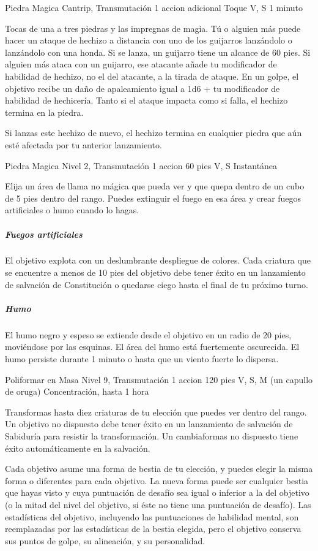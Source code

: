 \documentclass[a4paper,twocolumn,openany,10pt]{dndbook}
\begin{document}
\spellheader%
	{Piedra Magica}
	{Cantrip, Transmutación}
	{1 accion adicional}
	{Toque}
	{V, S}
	{1 minuto}
	
	Tocas de una a tres piedras y las impregnas de magia. Tú o alguien más puede hacer un ataque de hechizo a distancia con uno
	de los guijarros lanzándolo o lanzándolo con una honda. Si se lanza, un guijarro tiene un alcance de 60 pies. Si alguien más
	ataca con un guijarro, ese atacante añade tu modificador de habilidad de hechizo, no el del atacante, a la tirada de ataque.
	En un golpe, el objetivo recibe un daño de apaleamiento igual a 1d6 + tu modificador de habilidad de hechicería. Tanto si el
	ataque impacta como si falla, el hechizo termina en la piedra.
	
	Si lanzas este hechizo de nuevo, el hechizo termina en cualquier piedra que aún esté afectada por tu anterior lanzamiento. 

\spellheader%
	{Piedra Magica}
	{Nivel 2, Transmutación}
	{1 accion}
	{60 pies}
	{V, S}
	{Instantánea}
	
	Elija un área de llama no mágica que pueda ver y que quepa dentro de un cubo de 5 pies dentro del rango. Puedes extinguir el
	fuego en esa área y crear fuegos artificiales o humo cuando lo hagas.
	
	\subparagraph{Fuegos artificiales} El objetivo explota con un deslumbrante despliegue de colores. Cada criatura que se
	encuentre a menos de 10 pies del objetivo debe tener éxito en un lanzamiento de salvación de Constitución o quedarse ciego
	hasta el final de tu próximo turno.
	
	\subparagraph{Humo} El humo negro y espeso se extiende desde el objetivo en un radio de 20 pies, moviéndose por las
	esquinas. El área del humo está fuertemente oscurecida. El humo persiste durante 1 minuto o hasta que un viento fuerte lo
	dispersa. 

\spellheader%
	{Poliformar en Masa}
	{Nivel 9, Transmutación}
	{1 accion}
	{120 pies}
	{V, S, M (un capullo de oruga)}
	{Concentración, hasta 1 hora}
	
	Transformas hasta diez criaturas de tu elección que puedes ver dentro del rango. Un objetivo no dispuesto debe tener éxito
	en un lanzamiento de salvación de Sabiduría para resistir la transformación. Un cambiaformas no dispuesto tiene éxito
	automáticamente en la salvación.
	
	Cada objetivo asume una forma de bestia de tu elección, y puedes elegir la misma forma o diferentes para cada objetivo. La
	nueva forma puede ser cualquier bestia que hayas visto y cuya puntuación de desafío sea igual o inferior a la del objetivo
	(o la mitad del nivel del objetivo, si éste no tiene una puntuación de desafío). Las estadísticas del objetivo, incluyendo
	las puntuaciones de habilidad mental, son reemplazadas por las estadísticas de la bestia elegida, pero el objetivo conserva
	sus puntos de golpe, su alineación, y su personalidad.
	
\end{document}
